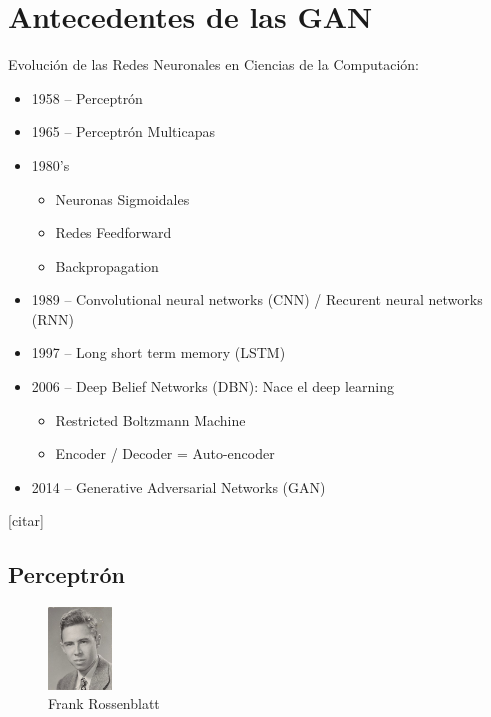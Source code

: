 \documentclass[a4paper]{article}
\begin{document}
\section{Antecedentes de las GAN}
Evolución de las Redes Neuronales en Ciencias de la Computación:
\begin{itemize}

    \item{1958 – Perceptrón}
    \item{1965 – Perceptrón Multicapas}
    \item{1980’s
    	\begin{itemize}
    	\item{Neuronas Sigmoidales}
        \item{Redes Feedforward}
        \item{Backpropagation}
        \end{itemize}
        }
    \item{1989 – Convolutional neural networks (CNN) / Recurent neural networks (RNN)}
    \item{1997 – Long short term memory (LSTM)}
    \item{2006 – Deep Belief Networks (DBN): Nace el deep learning}
    \begin{itemize}
    
        \item{Restricted Boltzmann Machine}
        \item{Encoder / Decoder = Auto-encoder}
        
    \end{itemize}
    \item{2014 – Generative Adversarial Networks (GAN)}

\end{itemize}[citar]


\subsection{Perceptrón}
\begin{figure} %
    \centering
    \includegraphics[width=0.15\textwidth]{./images/220px-Rosenblatt_21.jpg}
    \caption{Frank Rossenblatt}
\end{figure}
\end{document}
